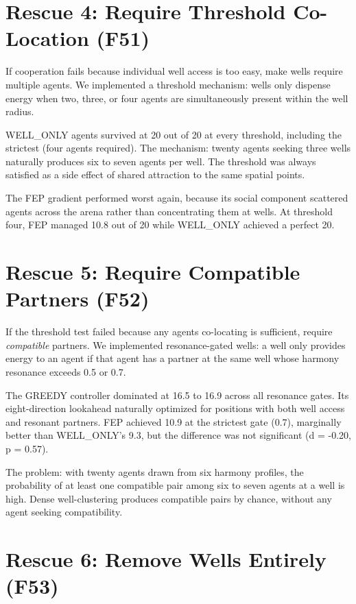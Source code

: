 \section{Rescue 4: Require Threshold Co-Location (F51)}\label{rescue-4-require-threshold-co-location-f51}

If cooperation fails because individual well access is too easy, make wells require multiple agents. We implemented a threshold mechanism: wells only dispense energy when two, three, or four agents are simultaneously present within the well radius.

WELL\_ONLY agents survived at 20 out of 20 at every threshold, including the strictest (four agents required). The mechanism: twenty agents seeking three wells naturally produces six to seven agents per well. The threshold was always satisfied as a side effect of shared attraction to the same spatial points.

The FEP gradient performed worst again, because its social component scattered agents across the arena rather than concentrating them at wells. At threshold four, FEP managed 10.8 out of 20 while WELL\_ONLY achieved a perfect 20.

\section{Rescue 5: Require Compatible Partners (F52)}\label{rescue-5-require-compatible-partners-f52}

If the threshold test failed because any agents co-locating is sufficient, require \emph{compatible} partners. We implemented resonance-gated wells: a well only provides energy to an agent if that agent has a partner at the same well whose harmony resonance exceeds 0.5 or 0.7.

The GREEDY controller dominated at 16.5 to 16.9 across all resonance gates. Its eight-direction lookahead naturally optimized for positions with both well access and resonant partners. FEP achieved 10.9 at the strictest gate (0.7), marginally better than WELL\_ONLY's 9.3, but the difference was not significant (d = -0.20, p = 0.57).

The problem: with twenty agents drawn from six harmony profiles, the probability of at least one compatible pair among six to seven agents at a well is high. Dense well-clustering produces compatible pairs by chance, without any agent seeking compatibility.

\section{Rescue 6: Remove Wells Entirely (F53)}\label{rescue-6-remove-wells-entirely-f53}

